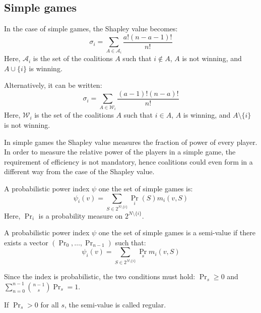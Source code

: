 \subsection{Simple games}
In the case of simple games, the Shapley value becomes: 
\[\sigma_i=\sum_{A\in\mathcal{A}_i}\dfrac{a!(n-a-1)!}{n!}\]
\noindent Here, $\mathcal{A}_i$ is the set of the coalitions $A$ such that $i \notin A$, $A$ is not winning, and $A\cup\{i\}$ is winning. 

Alternatively, it can be written: 
\[\sigma_i=\sum_{A\in\mathcal{W}_i}\dfrac{(a-1)!(n-a)!}{n!}\]
\noindent Here, $\mathcal{W}_i$ is the set of the coalitions $A$ such that $i \in A$, $A$ is winning, and $A\setminus\{i\}$ is not winning. 

In simple games the Shapley value measures the fraction of power of every player. 
In order to measure the relative power of the players in a simple game, the requirement of efficiency is not mandatory, hence coalitions could even form in a different way from the case of the Shapley value. 
\begin{definition}
    A probabilistic power index $\psi$ one the set of simple games is: 
    \[\psi_i(v)=\sum_{S\in2^{N\setminus\{i\}}}\Pr_i(S)m_i(v,S)\]
    Here, $\Pr_i$ is a probability measure on $2^{N\setminus\{i\}}$.
\end{definition}
\begin{definition}
    A probabilistic power index $\psi$ one the set of simple games is a semi-value if there exists a vector $(\Pr_0,\dots,\Pr_{n-1})$ such that: 
    \[\psi_i(v)=\sum_{S\in2^{N\setminus\{i\}}}\Pr_sm_i(v,S)\]
\end{definition}
\noindent Since the index is probabilistic, the two conditions must hold: $\Pr_s\geq 0$ and $\sum_{n=0}^{n-1}\binom{n-1}{s}\Pr_s=1$.
\begin{definition}
    If $\Pr_s>0$ for all $s$, the semi-value is called regular. 
\end{definition}